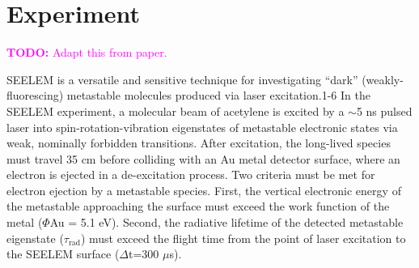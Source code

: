 \documentclass[12pt,draft]{mitthesis}
\newcommand{\TODO} [1]{\textcolor{magenta}{\textbf{TODO:} #1}}
\begin{document}


\section{Experiment}

\TODO{Adapt this from paper.}

SEELEM is a versatile and sensitive technique for investigating
``dark'' (weakly-fluorescing) metastable molecules produced via laser
excitation.1-6 In the SEELEM experiment, a molecular beam of acetylene
is excited by a $\sim$5 ns pulsed laser into spin-rotation-vibration
eigenstates of metastable electronic states via weak, nominally
forbidden transitions. After excitation, the long-lived species must
travel 35 cm before colliding with an Au metal detector surface, where
an electron is ejected in a de-excitation process. Two criteria must
be met for electron ejection by a metastable species. First, the
vertical electronic energy of the metastable approaching the surface
must exceed the work function of the metal ($\Phi$Au = 5.1
eV). Second, the radiative lifetime of the detected metastable
eigenstate ($\tau_\text{rad}$) must exceed the flight time from the
point of laser excitation to the SEELEM surface ($\Delta$t=300
$\mu$s).
\end{document}
